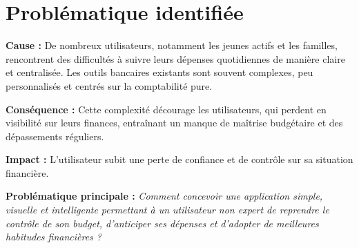 
\section{Problématique identifiée}

\begin{tcolorbox}[colback=red!5!white,colframe=red!60!black,title=\textbf{Problématique reformulée et validée}]
\textbf{Cause :} De nombreux utilisateurs, notamment les jeunes actifs et les familles, rencontrent des difficultés à suivre leurs dépenses quotidiennes de manière claire et centralisée.  
Les outils bancaires existants sont souvent complexes, peu personnalisés et centrés sur la comptabilité pure.

\textbf{Conséquence :} Cette complexité décourage les utilisateurs, qui perdent en visibilité sur leurs finances, entraînant un manque de maîtrise budgétaire et des dépassements réguliers.

\textbf{Impact :} L'utilisateur subit une perte de confiance et de contrôle sur sa situation financière.

\textbf{Problématique principale :}  
\textit{Comment concevoir une application simple, visuelle et intelligente permettant à un utilisateur non expert de reprendre le contrôle de son budget, d'anticiper ses dépenses et d'adopter de meilleures habitudes financières ?}
\end{tcolorbox}

